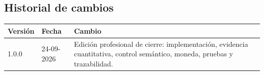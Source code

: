 \documentclass[11pt,letterpaper]{article}
\begin{document}
\subsection*{Historial de cambios}

\begin{tabularx}{\textwidth}{@{}p{}p{}X@{}}
  \toprule
  Versión & Fecha & Cambio \\
  \midrule
  1.0.0 & 24-09-2026 & Edición profesional de cierre: implementación, evidencia cuantitativa, control semántico, moneda, pruebas y trazabilidad. \\
  \bottomrule
\end{tabularx}
\end{document}
